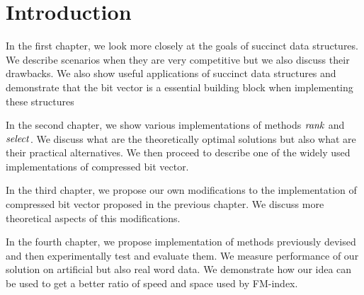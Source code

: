 \chapter*{Introduction} %

In the first chapter, we look more closely at the goals of succinct data structures.
We describe scenarios when they are very competitive but we also discuss their drawbacks.
We also show useful applications of succinct data structures and demonstrate that the bit
vector is a essential building block when implementing these structures

In the second chapter, we show various implementations of methods $\mathit{rank}$ and $\mathit{select}$.
We discuss what are the theoretically optimal solutions but also what are their practical
alternatives. We then proceed to describe one of the widely used implementations of compressed
bit vector.

In the third chapter, we propose our own modifications to the implementation of compressed bit
vector proposed in the previous chapter. We discuss more theoretical aspects of this modifications.

In the fourth chapter, we propose implementation of methods previously devised and then experimentally test
and evaluate them. We measure performance of our solution on artificial but also real word data. We demonstrate
how our idea can be used to get a better ratio of speed and space used by FM-index.

